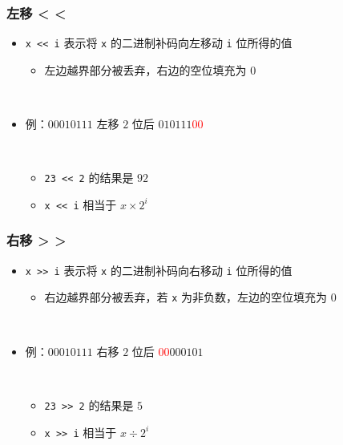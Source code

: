 \begin{frame}[fragile]
    \frametitle{左移 < <}

    \begin{itemize}
        \item \lstinline|x << i| 表示将 \lstinline|x| 的二进制补码向左移动 \lstinline|i| 位所得的值

        \begin{itemize}
            \item 左边越界部分被丢弃，右边的空位填充为 $0$
        \end{itemize}

        \quad \\

        \item 例：$00010111$ \quad 左移 $2$ 位后 \quad $010111$\textcolor{red}{$00$}
        
        \quad \\

        \begin{itemize}
            \item \lstinline|23 << 2| 的结果是 $92$
            \item \lstinline|x << i| 相当于 $x \times 2^i$
        \end{itemize}

    \end{itemize}

\end{frame}

\begin{frame}[fragile]
    \frametitle{右移 > >}

    \begin{itemize}
        \item \lstinline|x >> i| 表示将 \lstinline|x| 的二进制补码向右移动 \lstinline|i| 位所得的值

        \begin{itemize}
            \item 右边越界部分被丢弃，若 \lstinline|x| 为非负数，左边的空位填充为 $0$
        \end{itemize}

        \quad \\

        \item 例：$00010111$ \quad 右移 $2$ 位后 \quad \textcolor{red}{$00$}$000101$
        
        \quad \\

        \begin{itemize}
            \item \lstinline|23 >> 2| 的结果是 $5$
            \item \lstinline|x >> i| 相当于 $x \div 2^i$
        \end{itemize}

    \end{itemize}

\end{frame}


